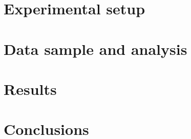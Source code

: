\documentclass[ALICE,manyauthors]{cernphprep}
\begin{document}
\section{Experimental setup}


\section {Data sample and analysis}

\section {Results}


\section{Conclusions}



\newenvironment{acknowledgement}{\relax}{\relax}

%

\newpage
\appendix
%
%







\clearpage


\end{document}
